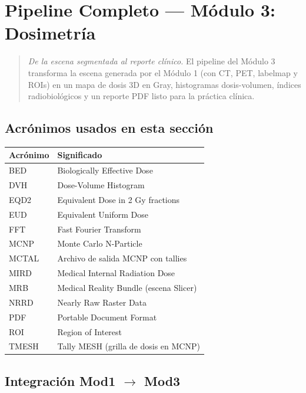 \documentclass[12pt,a4paper]{article}
\begin{document}
\section{Pipeline Completo --- Módulo 3: Dosimetría}

\begin{quote}
\textit{De la escena segmentada al reporte clínico.} El pipeline del Módulo 3 transforma la escena generada por el Módulo 1 (con CT, PET, labelmap y ROIs) en un mapa de dosis 3D en Gray, histogramas dosis-volumen, índices radiobiológicos y un reporte PDF listo para la práctica clínica.
\end{quote}

\subsection*{Acrónimos usados en esta sección}

\begin{tabular}{p{3cm} p{12cm}}
\toprule
\textbf{Acrónimo} & \textbf{Significado} \\
\midrule
BED & Biologically Effective Dose \\
DVH & Dose-Volume Histogram \\
EQD2 & Equivalent Dose in 2 Gy fractions \\
EUD & Equivalent Uniform Dose \\
FFT & Fast Fourier Transform \\
MCNP & Monte Carlo N-Particle \\
MCTAL & Archivo de salida MCNP con tallies \\
MIRD & Medical Internal Radiation Dose \\
MRB & Medical Reality Bundle (escena Slicer) \\
NRRD & Nearly Raw Raster Data \\
PDF & Portable Document Format \\
ROI & Region of Interest \\
TMESH & Tally MESH (grilla de dosis en MCNP) \\
\bottomrule
\end{tabular}

\subsection{Integración Mod1 $\to$ Mod3}
\end{document}
